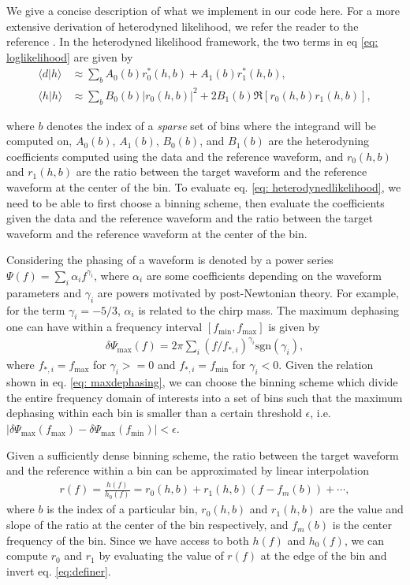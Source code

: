 \documentclass[twocolumn]{aastex631}
\begin{document}
We give a concise description of what we implement
in our code here. For a more extensive derivation of heterodyned
likelihood, we refer the reader to the reference \cite{Zackay:2018qdy}.
In the heterodyned likelihood framework, the two terms in eq \ref{eq:
loglikelihood} are given by
\begin{align}
    \langle d|h \rangle &\approx \sum_b A_0(b) r^*_0(h,b) + A_1(b) r^*_1(h,b), \nonumber \\
    \langle h|h \rangle &\approx \sum_b B_0(b) |r_0(h,b)|^2 + 2 B_1(b) \Re[r_0(h,b)r_1(h,b)],
\label{eq: heterodynedlikelihood}
\end{align}

where $b$ denotes the index of a \textit{sparse} set of bins where the integrand
will be computed on, $A_0(b)$, $A_1(b)$, $B_0(b)$, and $B_1(b)$ are the
heterodyning coefficients computed using the data and the reference waveform,
and $r_0(h,b)$ and $r_1(h,b)$ are the ratio between the target waveform and the
reference waveform at the center of the bin. To evaluate eq. \ref{eq:
heterodynedlikelihood}, we need to be able to first choose a binning scheme,
then evaluate the coefficients given the data and the reference waveform and the
ratio between the target waveform and the reference waveform at the center of
the bin.

Considering the phasing of a waveform is denoted by a power series $\Psi(f) =
\sum_i \alpha_i f^{\gamma_i}$, where $\alpha_i$ are some coefficients depending
on the waveform parameters and $\gamma_i$ are powers motivated by post-Newtonian
theory. For example, for the term $\gamma_i = -5/3$, $\alpha_i$ is related to
the chirp mass. The maximum dephasing one can have within a frequency interval $[f_{\textrm{min}},f_{\textrm{max}}]$ is given by
\begin{align}
    \delta \Psi_{\textrm{max}}(f) = 2\pi \sum_{i} (f/f_{*,i})^{\gamma_i} \textrm{sgn}(\gamma_i),
\label{eq: maxdephasing}
\end{align}
where $f_{*,i} = f_{\textrm{max}}$ for $\gamma_i>=0$ and $f_{*,i} =
f_{\textrm{min}}$ for $\gamma_i<0$. Given the relation shown in eq. \ref{eq:
maxdephasing}, we can choose the binning scheme which divide the entire
frequency domain of interests into a set of bins such that the maximum dephasing
within each bin is smaller than a certain threshold $\epsilon$, i.e.
$|\delta\Psi_{\textrm{max}}(f_{\textrm{max}}) -
\delta\Psi_{\textrm{max}}(f_{\textrm{min}})| < \epsilon$. 

Given a sufficiently dense binning scheme, the ratio between the target waveform
and the reference within a bin can be approximated by linear interpolation
\begin{align}
r(f) = \frac{h(f)}{h_0(f)} = r_0(h,b) + r_1(h,b)(f- f_m(b)) + \cdots,
\label{eq:definer}
\end{align}
where $b$ is the index of a particular bin, $r_0(h,b)$ and $r_1(h,b)$ are the
value and slope of the ratio at the center of the bin respectively, and
$f_m(b)$ is the center frequency of the bin. Since we have access to both $h(f)$
and $h_0(f)$, we can compute $r_0$ and $r_1$ by evaluating the value of $r(f)$
at the edge of the bin and invert eq. \ref{eq:definer}.
\end{document}
